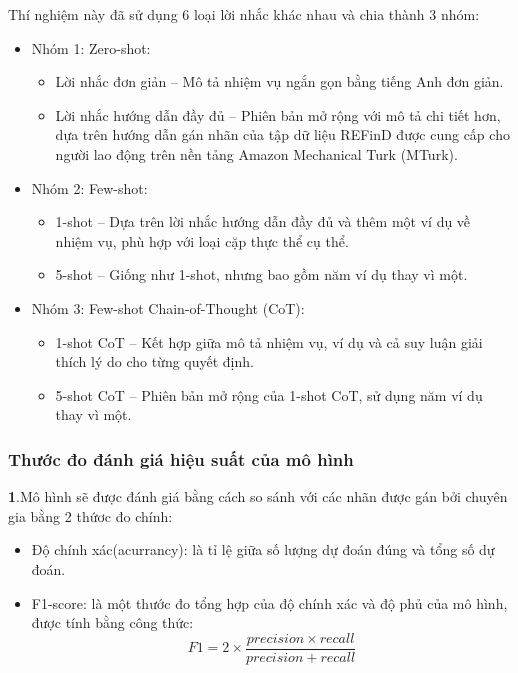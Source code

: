 \documentclass{article} %
\begin{document}
Thí nghiệm này đã sử dụng 6 loại lời nhắc khác nhau và chia thành 3 nhóm: 

\begin{itemize}
    \item Nhóm 1: Zero-shot:
    \begin{itemize}[label=-]
        \item Lời nhắc đơn giản – Mô tả nhiệm vụ ngắn gọn bằng tiếng Anh đơn giản.
        \item Lời nhắc hướng dẫn đầy đủ – Phiên bản mở rộng với mô tả chi tiết hơn, 
    dựa trên hướng dẫn gán nhãn của tập dữ liệu REFinD được cung cấp cho người lao động trên nền tảng Amazon Mechanical Turk (MTurk).
    \end{itemize}
    \item Nhóm 2: Few-shot:
    \begin{itemize}[label=-]
        \item 1-shot – Dựa trên lời nhắc hướng dẫn đầy đủ và thêm một ví dụ về nhiệm vụ, phù hợp với loại cặp thực thể cụ thể.
        \item 5-shot – Giống như 1-shot, nhưng bao gồm năm ví dụ thay vì một.
    \end{itemize}
    \item Nhóm 3: Few-shot Chain-of-Thought (CoT):
    \begin{itemize}[label=-]
        \item 1-shot CoT – Kết hợp giữa mô tả nhiệm vụ, ví dụ và cả suy luận giải thích lý do cho từng quyết định.
        \item 5-shot CoT – Phiên bản mở rộng của 1-shot CoT, sử dụng năm ví dụ thay vì một.
    \end{itemize}
\end{itemize}

\subsubsection{Thước đo đánh giá hiệu suất của mô hình}

\textbf{1}.Mô hình sẽ được đánh giá bằng cách so sánh với các nhãn được gán bởi chuyên gia bằng 2 thứơc đo chính:
\begin{itemize}
    \item Độ chính xác(acurrancy): là tỉ lệ giữa số lượng dự đoán đúng và tổng số dự đoán.
    \item F1-score: là một thước đo tổng hợp của độ chính xác và độ phủ của mô hình, được tính bằng công thức: 
    \[F1 = 2 \times \frac{precision \times recall}{precision + recall}\]
\end{itemize}
\end{document}
